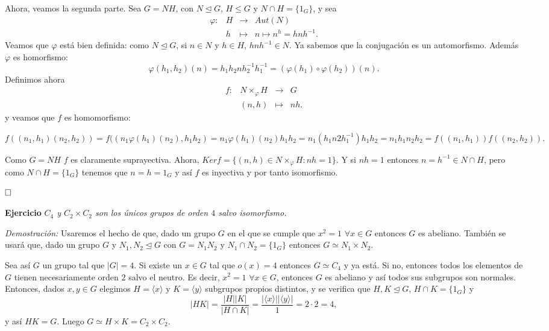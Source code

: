 \documentclass[12pt]{article}
\begin{document}
Ahora, veamos la segunda parte. Sea $G=NH$, con $N \unlhd G$, $H\leq G$ y $N \cap H = \lbrace 1_{G} \rbrace$, y sea 
$$\begin{array}{rccl}
\varphi\colon &H & \longrightarrow & Aut(N)\\
&h& \longmapsto &n \longmapsto n^{h} = hnh^{-1}.
\end{array}
$$
Veamos que $\varphi$ está bien definida: como $N \unlhd G$, si $n \in N$ y $h \in H$, $hnh^{-1} \in N$. Ya sabemos que la conjugación es un automorfismo. Además $\varphi$ es homorfismo: $$\varphi(h_{1},h_{2})(n)=h_{1}h_{2}nh_{2}^{-1}h_{1}^{-1}=(\varphi(h_{1}) \circ \varphi(h_{2}))(n).$$
Definimos ahora $$\begin{array}{rccl}
f\colon &N \times _{\varphi} H & \longrightarrow & G\\
&(n,h)& \longmapsto &nh.
\end{array}
$$
y veamos que $f$ es homomorfismo: \begin{center}$f((n_{1},h_{1})(n_{2},h_{2}))=f((n_{1}\varphi(h_{1})(n_{2}),h_{1}h_{2})=n_{1}\varphi(h_{1})(n_{2})h_{1}h_{2}=n_{1}(h_{1}n2h_{1}^{-1})h_{1}h_{2}=n_{1}h_{1}n_{2}h_{2}=f((n_{1},h_{1}))f((n_{2},h_{2})).$\end{center}

Como $G=NH$ $f$ es claramente suprayectiva. Ahora, $Ker f= \lbrace (n,h) \in N\times_{\varphi} H :nh=1 \rbrace$. Y si $nh=1$ entonces $n=h^{-1}\in N \cap H$, pero como $N \cap H = \lbrace 1_{G} \rbrace$ tenemos que $n=h=1_{G}$ y así $f$ es inyectiva y por tanto isomorfismo.

$\hfill \square$


\textbf{Ejercicio} \textit{$C_{4}$ y\hspace{0.1cm} $C_{2} \times C_{2}$ son los únicos grupos de orden $4$ salvo isomorfismo.}

\emph{Demostración: }Usaremos el hecho de que, dado un grupo $G$ en el que se cumple que $x^{2}=1$ $\forall x \in G$ entonces $G$ es abeliano. También se usará que, dado un grupo $G$ y $N_{1},N_{2} \unlhd G$ con $G = N_{1}N_{2}$ y $N_{1}\cap N_{2} =\lbrace 1_{G}\rbrace$ entonces $G \simeq N_{1} \times N_{2}.$

Sea así $G$ un grupo tal que $|G| = 4$. Si existe un $x \in G$ tal que $o(x)=4$ entonces $G \simeq C_{4}$ y ya está. Si no, entonces todos los elementos de $G$ tienen necesariamente orden $2$ salvo el neutro. Es decir, $x^{2}=1$ $\forall x\in G$, entonces $G$ es abeliano y así todos sus subgrupos son normales. Entonces, dados $x,y \in G$ elegimos $H= \langle x \rangle$ y $K = \langle y \rangle$ subgrupos propios distintos, y se verifica que $H, K \unlhd G$, $H \cap K = \lbrace 1_{G} \rbrace$ y $$|HK| = \dfrac{|H||K|}{|H \cap K|} = \dfrac{|\langle x\rangle | |\langle y \rangle |}{1}= 2\cdot 2 = 4,$$ y así $HK = G$. Luego $G \simeq H \times K = C_{2}\times C_{2}.$
\end{document}
